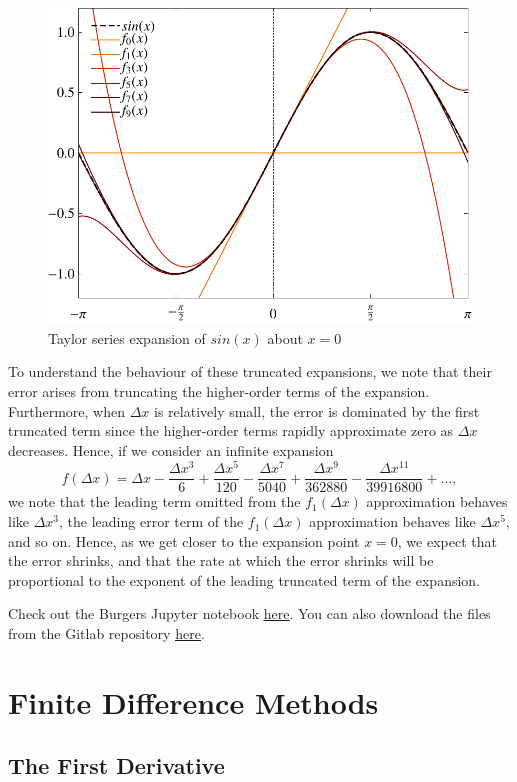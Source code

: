 \begin{figure}[htbp]
	\centering
	\includegraphics[width=0.6\linewidth]{Pictures/taylor_series_sin}
	\caption{Taylor series expansion of $sin(x)$ about $x=0$}
	\label{fig:taylor_series}
\end{figure}

To understand the behaviour of these truncated expansions, we note that their error arises from truncating the higher-order terms of the expansion. Furthermore, when $\Delta x$ is relatively small, the error is dominated by the first truncated term since the higher-order terms rapidly approximate zero as $\Delta x$ decreases. Hence, if we consider an infinite expansion
\begin{equation}
	f(\Delta x) = \Delta x - \frac{\Delta x^3}{6} + \frac{\Delta x^5}{120} - \frac{\Delta x^7}{5040} + \frac{\Delta x^9}{362880} - \frac{\Delta x^{11}}{39916800} + \hdots,
\end{equation}
we note that the leading term omitted from the $f_1(\Delta x)$ approximation behaves like $\Delta x^3$, the leading error term of the $f_1(\Delta x)$ approximation behaves like $\Delta x^5$, and so on. Hence, as we get closer to the expansion point $x=0$, we expect that the error shrinks, and that the rate at which the error shrinks will be proportional to the exponent of the leading truncated term of the expansion.
\begin{jupyternote}
	Check out the Burgers Jupyter notebook \href{\binderurl}{\underline{here}}. You can also download the files from the Gitlab repository \href{\repourl}{\underline{here}}.
\end{jupyternote}
\chapter{Finite Difference Methods}
\section{The First Derivative}

